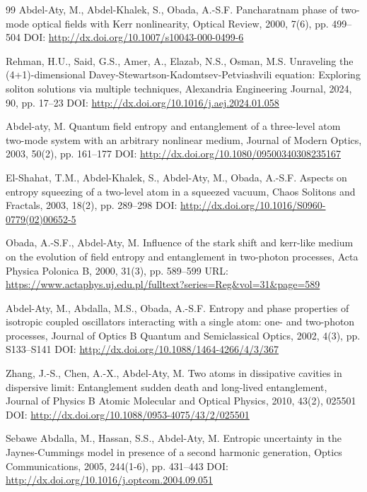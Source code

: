 \documentclass[10pt]{NSP1}
\numberwithin{equation}{section}
\begin{document}
\begin{thebibliography}{99}
 Abdel-Aty, M., Abdel-Khalek, S., Obada, A.-S.F.
Pancharatnam phase of two-mode optical fields with Kerr nonlinearity, Optical Review, 2000, 7(6), pp. 499--504 DOI: \url{http://dx.doi.org/10.1007/s10043-000-0499-6}

 Rehman, H.U., Said, G.S., Amer, A., Elazab, N.S., Osman, M.S.
Unraveling the (4+1)-dimensional Davey-Stewartson-Kadomtsev-Petviashvili equation: Exploring soliton solutions via multiple techniques, Alexandria Engineering Journal, 2024, 90, pp. 17--23 DOI: \url{http://dx.doi.org/10.1016/j.aej.2024.01.058}

 Abdel-aty, M.
Quantum field entropy and entanglement of a three-level atom two-mode system with an arbitrary nonlinear medium, Journal of Modern Optics, 2003, 50(2), pp. 161--177 DOI: \url{http://dx.doi.org/10.1080/09500340308235167}

 El-Shahat, T.M., Abdel-Khalek, S., Abdel-Aty, M., Obada, A.-S.F.
Aspects on entropy squeezing of a two-level atom in a squeezed vacuum, Chaos Solitons and Fractals, 2003, 18(2), pp. 289--298 DOI: \url{http://dx.doi.org/10.1016/S0960-0779(02)00652-5}

 Obada, A.-S.F., Abdel-Aty, M.
Influence of the stark shift and kerr-like medium on the evolution of field entropy and entanglement in two-photon processes, Acta Physica Polonica B, 2000, 31(3), pp. 589--599 URL: \url{https://www.actaphys.uj.edu.pl/fulltext?series=Reg&vol=31&page=589}

 Abdel-Aty, M., Abdalla, M.S., Obada, A.-S.F.
Entropy and phase properties of isotropic coupled oscillators interacting with a single atom: one- and two-photon processes, Journal of Optics B Quantum and Semiclassical Optics, 2002, 4(3), pp. S133--S141 DOI: \url{http://dx.doi.org/10.1088/1464-4266/4/3/367}

 Zhang, J.-S., Chen, A.-X., Abdel-Aty, M.
Two atoms in dissipative cavities in dispersive limit: Entanglement sudden death and long-lived entanglement, Journal of Physics B Atomic Molecular and Optical Physics, 2010, 43(2), 025501 DOI: \url{http://dx.doi.org/10.1088/0953-4075/43/2/025501}

 Sebawe Abdalla, M., Hassan, S.S., Abdel-Aty, M.
Entropic uncertainty in the Jaynes-Cummings model in presence of a second harmonic generation, Optics Communications, 2005, 244(1-6), pp. 431--443 DOI: \url{http://dx.doi.org/10.1016/j.optcom.2004.09.051}


\end{thebibliography}
\end{document}
